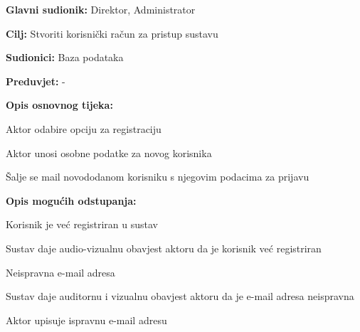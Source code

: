 					\noindent {}
					\begin{packed_item}
	
						\item \textbf{Glavni sudionik: }Direktor, Administrator
						\item  \textbf{Cilj:} Stvoriti korisnički račun za pristup sustavu
						\item  \textbf{Sudionici:} Baza podataka
						\item  \textbf{Preduvjet:} -
						\item  \textbf{Opis osnovnog tijeka:}
						
						\item[] \begin{packed_enum}
	
							\item Aktor odabire opciju za registraciju
							\item Aktor unosi osobne podatke za novog korisnika
							\item Šalje se mail novododanom korisniku s njegovim podacima za prijavu
						\end{packed_enum}
						
						\item  \textbf{Opis mogućih odstupanja:}
						
						\item[] \begin{packed_item}
	
							\item[2.a] Korisnik je već registriran u sustav
							\item[] \begin{packed_enum}
								
								\item Sustav daje audio-vizualnu obavjest aktoru da je korisnik već registriran
								
							\end{packed_enum}
							
							\item[2.b] Neispravna e-mail adresa
							\item[] \begin{packed_enum}
								
								\item Sustav daje auditornu i vizualnu obavjest aktoru da je e-mail adresa neispravna
								\item Aktor upisuje ispravnu e-mail adresu
							\end{packed_enum}
							
						\end{packed_item}
					\end{packed_item}
					
